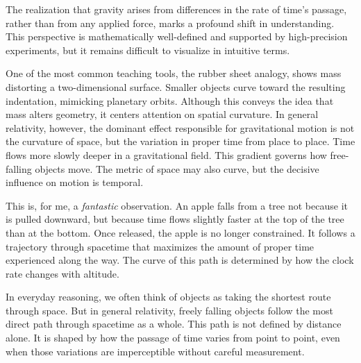 \begin{commentary}

The realization that gravity arises from differences in the rate of time’s passage, rather than from any applied force, marks a profound shift in understanding. This perspective is mathematically well-defined and supported by high-precision experiments, but it remains difficult to visualize in intuitive terms.

One of the most common teaching tools, the rubber sheet analogy, shows mass distorting a two-dimensional surface. Smaller objects curve toward the resulting indentation, mimicking planetary orbits. Although this conveys the idea that mass alters geometry, it centers attention on spatial curvature. In general relativity, however, the dominant effect responsible for gravitational motion is not the curvature of space, but the variation in proper time from place to place. Time flows more slowly deeper in a gravitational field. This gradient governs how free-falling objects move. The metric of space may also curve, but the decisive influence on motion is temporal.

This is, for me, a \textit{fantastic} observation. An apple falls from a tree not because it is pulled downward, but because time flows slightly faster at the top of the tree than at the bottom. Once released, the apple is no longer constrained. It follows a trajectory through spacetime that maximizes the amount of proper time experienced along the way. The curve of this path is determined by how the clock rate changes with altitude.

In everyday reasoning, we often think of objects as taking the shortest route through space. But in general relativity, freely falling objects follow the most direct path through spacetime as a whole. This path is not defined by distance alone. It is shaped by how the passage of time varies from point to point, even when those variations are imperceptible without careful measurement.

\end{commentary}


